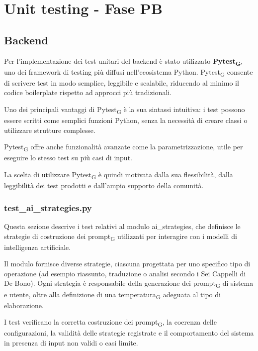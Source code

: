 \documentclass[11pt,a4paper]{article}
\newcommand{\gls}[1]{#1\textsubscript{G}}
\begin{document}
\newpage

\section{Unit testing - Fase PB}

\subsection{Backend}
Per l’implementazione dei test unitari del backend è stato utilizzato \textbf{\gls{Pytest}}, uno dei framework di testing più diffusi nell’ecosistema Python. \gls{Pytest} consente di scrivere test in modo semplice, leggibile e scalabile, riducendo al minimo il codice boilerplate rispetto ad approcci più tradizionali.

Uno dei principali vantaggi di \gls{Pytest} è la sua sintassi intuitiva: i test possono essere scritti come semplici funzioni Python, senza la necessità di creare classi o utilizzare strutture complesse.

\gls{Pytest} offre anche funzionalità avanzate come la parametrizzazione, utile per eseguire lo stesso test su più casi di input.

La scelta di utilizzare \gls{Pytest} è quindi motivata dalla sua flessibilità, dalla leggibilità dei test prodotti e dall’ampio supporto della comunità.


\subsubsection{test\_ai\_strategies.py}
Questa sezione descrive i test relativi al modulo ai\_strategies, che definisce le strategie di costruzione dei \gls{prompt} utilizzati per interagire con i modelli di intelligenza artificiale.

Il modulo fornisce diverse strategie, ciascuna progettata per uno specifico tipo di operazione (ad esempio riassunto, traduzione o analisi secondo i Sei Cappelli di De Bono). Ogni strategia è responsabile della generazione dei \gls{prompt} di sistema e utente, oltre alla definizione di una \gls{temperatura} adeguata al tipo di elaborazione.

I test verificano la corretta costruzione dei \gls{prompt}, la coerenza delle configurazioni, la validità delle strategie registrate e il comportamento del sistema in presenza di input non validi o casi limite.
\end{document}

